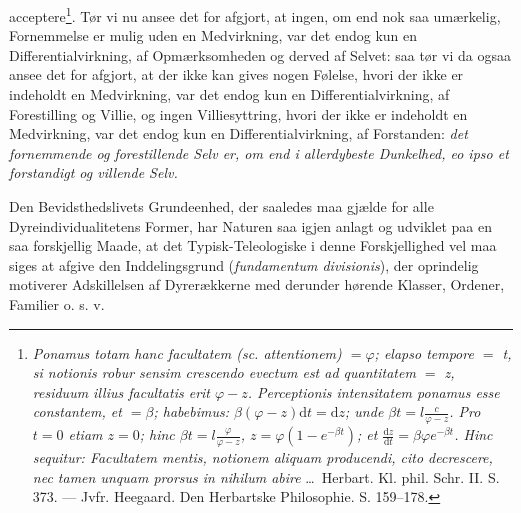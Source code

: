\documentclass[12pt,a4paper]{book}
\begin{document}
acceptere\footnote{\textit{Ponamus totam hanc facultatem (sc. attentionem)
$=\varphi$; elapso tempore $=$ t, si notionis robur sensim crescendo evectum est
ad quantitatem $=$ z, residuum illius facultatis erit $\varphi - z$. Perceptionis
intensitatem ponamus esse constantem, et $=\beta$; habebimus:
$\beta(\varphi-z)\mathrm{d}t = \mathrm{d}z$; unde
$\beta t = l\frac{c}{\varphi-z}$. Pro $t = 0$ etiam $z = 0$; hinc
$\beta t = l\frac{\varphi}{\varphi-z}$, $z = \varphi\left(1-e^{-\beta t}\right)$;
et $\frac{\mathrm{d}z}{\mathrm{d}t} = \beta\varphi e^{-\beta t}$. Hinc sequitur:
Facultatem mentis, notionem aliquam producendi, cito decrescere, nec tamen
unquam prorsus in nihilum abire} \dots\ Herbart. Kl. phil. Schr. II. S. 373. ---
Jvfr. Heegaard. Den Herbartske Philosophie. S. 159--178.}.
\setcounter{footnote}{0}
Tør vi nu ansee det for afgjort, at ingen, om end nok saa umærkelig,
Fornemmelse er mulig uden en Medvirkning, var det endog kun en
Differentialvirkning, af Opmærksomheden og derved af Selvet: saa tør vi da ogsaa
ansee det for afgjort, at der ikke kan gives nogen Følelse, hvori der ikke er
indeholdt en Medvirkning, var det endog kun en Differentialvirkning, af
Forestilling og Villie, og ingen Villiesyttring, hvori der ikke er indeholdt en
Medvirkning, var det endog kun en Differentialvirkning, af Forstanden:
\emph{det fornemmende og forestillende Selv er, om end i allerdybeste
Dunkelhed, \textit{eo ipso} et forstandigt og villende Selv.}

Den Bevidsthedslivets Grundeenhed, der saaledes maa gjælde for alle
Dyreindividualitetens Former, har Naturen saa igjen anlagt og udviklet paa en
saa forskjellig Maade, at det Typisk-Teleologiske i denne Forskjellighed vel maa
siges at afgive den Inddelingsgrund (\textit{fundamentum divisionis}), der
oprindelig motiverer Adskillelsen af Dyrerækkerne med derunder hørende Klasser,
Ordener, Familier o. s. v.
\end{document}

